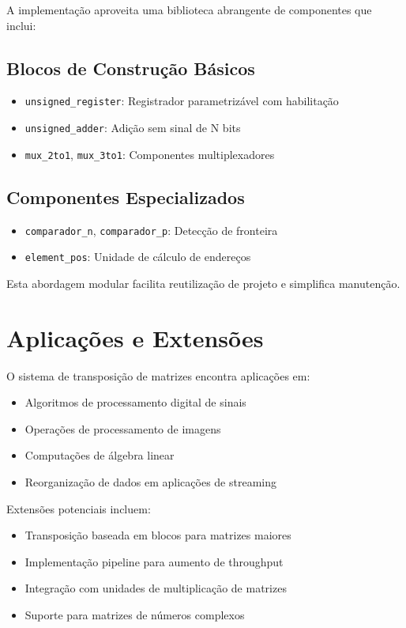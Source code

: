 \documentclass[conference]{IEEEtran}
\begin{document}
A implementação aproveita uma biblioteca abrangente de componentes que inclui:

\subsection{Blocos de Construção Básicos}
\begin{itemize}
\item \texttt{unsigned\_register}: Registrador parametrizável com habilitação
\item \texttt{unsigned\_adder}: Adição sem sinal de N bits
\item \texttt{mux\_2to1}, \texttt{mux\_3to1}: Componentes multiplexadores
\end{itemize}

\subsection{Componentes Especializados}
\begin{itemize}
\item \texttt{comparador\_n}, \texttt{comparador\_p}: Detecção de fronteira
\item \texttt{element\_pos}: Unidade de cálculo de endereços
\end{itemize}

Esta abordagem modular facilita reutilização de projeto e simplifica manutenção.

\section{Aplicações e Extensões}

O sistema de transposição de matrizes encontra aplicações em:

\begin{itemize}
\item Algoritmos de processamento digital de sinais
\item Operações de processamento de imagens
\item Computações de álgebra linear
\item Reorganização de dados em aplicações de streaming
\end{itemize}

Extensões potenciais incluem:
\begin{itemize}
\item Transposição baseada em blocos para matrizes maiores
\item Implementação pipeline para aumento de throughput
\item Integração com unidades de multiplicação de matrizes
\item Suporte para matrizes de números complexos
\end{itemize}
\end{document}
